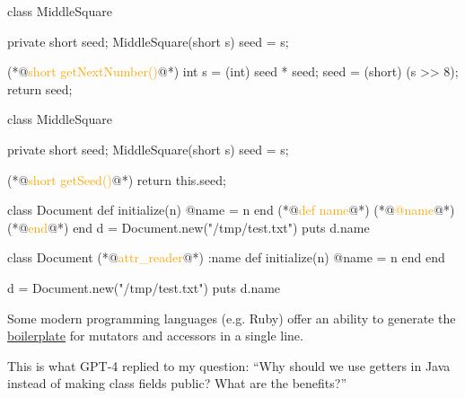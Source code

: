\documentclass{article}
\begin{document}
\begin{pptWide}{2}
{\small\begin{ffcode}
class MiddleSquare {
  private short seed;
  MiddleSquare(short s) { seed = s; }

  (*@\textcolor{orange}{short getNextNumber()}@*) {
    int s = (int) seed * seed;
    seed = (short) (s >> 8);
    return seed;
  }
}
\end{ffcode}
}
\par\columnbreak\par
{\small\begin{ffcode}
class MiddleSquare {
  private short seed;
  MiddleSquare(short s) { seed = s; }

  (*@\textcolor{orange}{short getSeed()}@*) {
    return this.seed;
  }
}
\end{ffcode}
}
\end{pptWide}
\par
\plush{}

\begin{pptWide}{2}
{\small\begin{ffcode}
class Document
  def initialize(n)
    @name = n
  end
  (*@\textcolor{orange}{def name}@*)
    (*@\textcolor{orange}{@name}@*)
  (*@\textcolor{orange}{end}@*)
end
d = Document.new("/tmp/test.txt")
puts d.name
\end{ffcode}
}
\par\columnbreak\par
{\small\begin{ffcode}
class Document
  (*@\textcolor{orange}{attr\_reader}@*) :name
  def initialize(n)
    @name = n
  end
end

d = Document.new("/tmp/test.txt")
puts d.name
\end{ffcode}
}
\end{pptWide}
\par
Some modern programming languages (e.g. Ruby) offer an ability to generate the \ul{boilerplate} for mutators and accessors in a single line.
\plush{}

\begin{pptWide}{2}
\par\columnbreak\par
{}
\end{pptWide}
\par
This is what GPT-4 replied to my question: ``Why should we use getters in Java instead of making class fields public? What are the benefits?''
\plush{}
\end{document}
